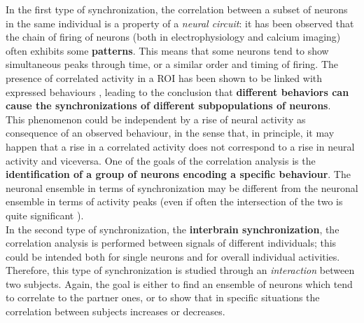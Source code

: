 \documentclass[12pt, a4paper]{report}
\begin{document}
In the first type of synchronization,  the correlation between a subset of neurons in the same individual is a property of a \textit{neural circuit}: it has been observed that the chain of firing of neurons (both in electrophysiology and calcium imaging) often exhibits some \textbf{patterns}. This means that some neurons tend to show simultaneous peaks through time, or a similar order and timing of firing. The presence of correlated activity in a ROI has been shown to be linked with expressed behaviours \cite{13}, %
leading to the conclusion that \textbf{different behaviors can cause the synchronizations of different  subpopulations of neurons}.\\
This phenomenon could be independent by a rise of neural activity as consequence of an observed behaviour, in the sense that, in principle, it may happen that a rise in a correlated activity does not correspond to a rise in neural activity and viceversa. One of the goals of the correlation analysis is the \textbf{identification of a group of neurons encoding a specific behaviour}. The neuronal ensemble in terms of synchronization may be different from the neuronal ensemble in terms of activity peaks (even if often the intersection of the two is quite significant \cite{8}).\\
In the second type of synchronization, the \textbf{interbrain synchronization}, the correlation analysis is performed between signals of different individuals; this could be intended both for single neurons and for  overall individual activities. Therefore, this type of synchronization is studied through an \textit{interaction} between two subjects. Again, the goal is either to find an ensemble of neurons which tend to correlate to the partner ones, or to show that in specific situations the correlation between subjects increases or decreases.\\
\end{document}
